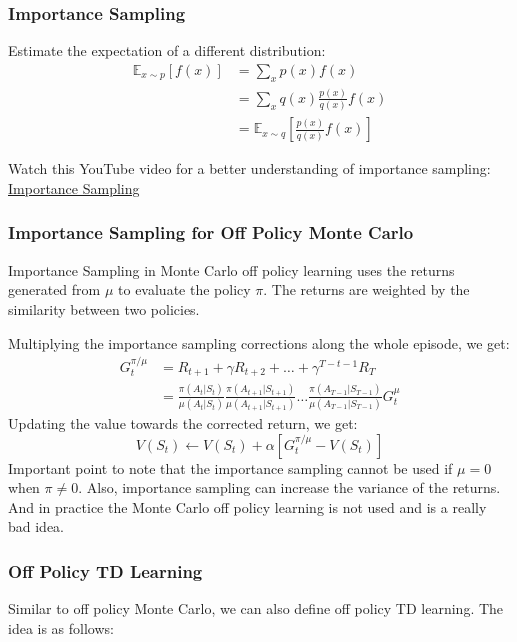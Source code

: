 \subsubsection{Importance Sampling}
Estimate the expectation of a different distribution:
\[
  \begin{aligned}
    \mathbb{E}_{x \sim p}[f(x)] &= \sum_{x} p(x) f(x) \\
    &= \sum_{x} q(x) \frac{p(x)}{q(x)} f(x) \\
    &= \mathbb{E}_{x \sim q} \left[ 
      \frac{p(x)}{q(x)} f(x)
    \right]    
  \end{aligned}
\]
\begin{note}
  Watch this YouTube video for a better understanding of importance sampling:
  \href{https://www.youtube.com/watch?v=C3p2wI4RAi8}{Importance Sampling}
\end{note}

\subsubsection{Importance Sampling for Off Policy Monte Carlo}
Importance Sampling in Monte Carlo off policy learning uses the returns generated 
from \(\mu\) to evaluate the policy \(\pi\). The returns are weighted by the similarity
between two policies.

Multiplying the importance sampling corrections along the whole episode, we get:
\[
  \begin{aligned}
    G_t^{\pi/\mu}  &= R_{t+1} + \gamma R_{t+2} + \dots + \gamma^{T-t-1} R_{T} \\
    &= \frac{\pi(A_t|S_t)}{\mu(A_t|S_t)} \frac{\pi(A_{t+1}|S_{t+1})}{\mu(A_{t+1}|S_{t+1})}
    \dots \frac{\pi(A_{T-1}|S_{T-1})}{\mu(A_{T-1}|S_{T-1})} G_t^\mu
  \end{aligned}
\]
Updating the value towards the corrected return, we get:
\[
  V(S_t) \leftarrow V(S_t) + \alpha \left[ 
    G_t^{\pi/\mu} - V(S_t)
  \right]
\]
Important point to note that the importance sampling cannot be used if \(\mu =0\) when 
\(\pi \neq 0\). Also, importance sampling can increase the variance of the returns. And in
practice the Monte Carlo off policy learning is not used and is a really bad idea.

\subsubsection{Off Policy TD Learning}
Similar to off policy Monte Carlo, we can also define off policy TD learning. The idea is
as follows:


